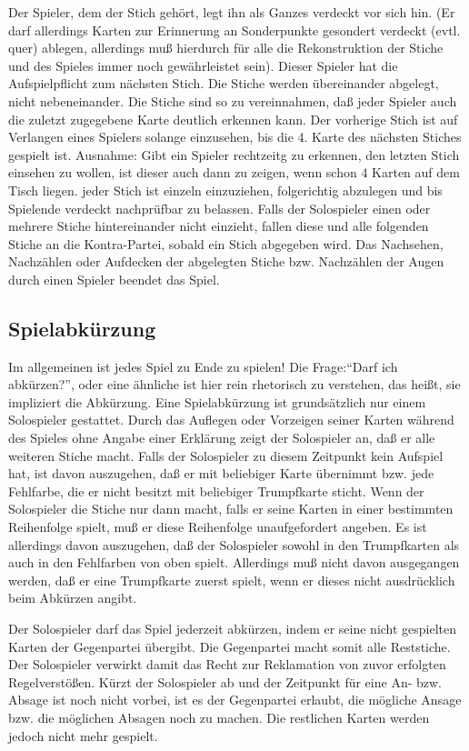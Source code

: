 \documentclass[12pt]{scrartcl}
\begin{document}
Der Spieler, dem der Stich gehört, legt ihn als Ganzes verdeckt
vor sich hin. (Er darf allerdings Karten zur Erinnerung an
Sonderpunkte gesondert verdeckt (evtl. quer) ablegen, allerdings
muß hierdurch für alle die Rekonstruktion der Stiche und des
Spieles immer noch gewährleistet sein). Dieser Spieler hat die
Aufspielpflicht zum nächsten Stich. Die Stiche werden
übereinander abgelegt, nicht nebeneinander. Die Stiche sind so
zu vereinnahmen, daß jeder Spieler auch die zuletzt zugegebene
Karte deutlich erkennen kann. Der vorherige Stich ist auf
Verlangen eines Spielers solange einzusehen, bis die 4. Karte des
nächsten Stiches gespielt ist. Ausnahme: Gibt ein Spieler
rechtzeitg zu erkennen, den letzten Stich einsehen zu wollen, ist
dieser auch dann zu zeigen, wenn schon 4 Karten auf dem Tisch
liegen. jeder Stich ist einzeln einzuziehen, folgerichtig
abzulegen und bis Spielende verdeckt nachprüfbar zu belassen.
Falls der Solospieler einen oder mehrere Stiche hintereinander
nicht einzieht, fallen diese und alle folgenden Stiche an die
Kontra-Partei, sobald ein Stich abgegeben wird. Das Nachsehen,
Nachzählen oder Aufdecken der abgelegten Stiche bzw. Nachzählen
der Augen durch einen Spieler beendet das Spiel.

\subsection{Spielabkürzung}
Im allgemeinen ist jedes Spiel zu Ende zu spielen! Die
Frage:"`Darf ich abkürzen?"', oder eine ähnliche ist hier rein
rhetorisch zu verstehen, das heißt, sie impliziert die
Abkürzung. Eine Spielabkürzung ist grundsätzlich nur einem
Solospieler gestattet. Durch das Auflegen oder Vorzeigen seiner
Karten während des Spieles ohne Angabe einer Erklärung zeigt
der Solospieler an, daß er alle weiteren Stiche macht. Falls der
Solospieler zu diesem Zeitpunkt kein Aufspiel hat, ist davon
auszugehen, daß er mit beliebiger Karte übernimmt bzw. jede
Fehlfarbe, die er nicht besitzt mit beliebiger Trumpfkarte sticht.
Wenn der Solospieler die Stiche nur dann macht, falls er seine
Karten in einer bestimmten Reihenfolge spielt, muß er diese
Reihenfolge unaufgefordert angeben. Es ist allerdings davon
auszugehen, daß der Solospieler sowohl in den Trumpfkarten als
auch in den Fehlfarben von oben spielt. Allerdings muß nicht
davon ausgegangen werden, daß er eine Trumpfkarte zuerst spielt,
wenn er dieses nicht ausdrücklich beim Abkürzen angibt.

Der Solospieler darf das Spiel jederzeit abkürzen, indem er
seine nicht gespielten Karten der Gegenpartei übergibt. Die
Gegenpartei macht somit alle Reststiche. Der Solospieler verwirkt
damit das Recht zur Reklamation von zuvor erfolgten
Regelverstößen. Kürzt der Solospieler ab und der Zeitpunkt
für eine An- bzw. Absage ist noch nicht vorbei, ist es der
Gegenpartei erlaubt, die mögliche Ansage bzw. die möglichen
Absagen noch zu machen. Die restlichen Karten werden jedoch nicht
mehr gespielt.
\end{document}
